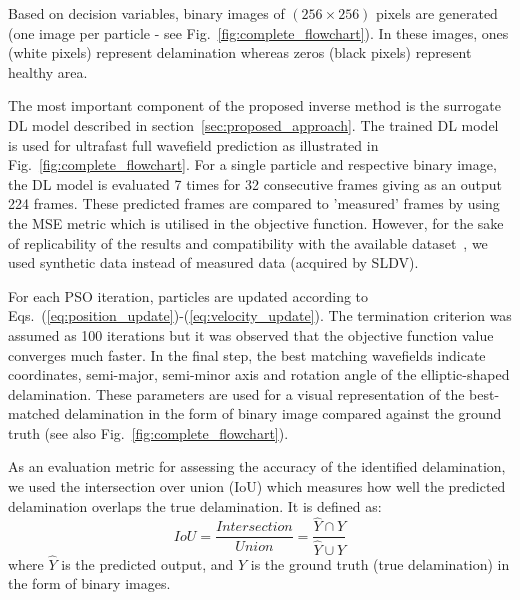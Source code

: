Based on decision variables, binary images of $(256\times256)$ pixels are generated (one image per particle - see Fig.~\ref{fig:complete_flowchart}).
In these images, ones (white pixels) represent delamination whereas zeros (black pixels) represent healthy area.

The most important component of the proposed inverse method is the surrogate DL model described in section~\ref{sec:proposed_approach}.
The trained DL model is used for ultrafast full wavefield prediction as illustrated in Fig.~\ref{fig:complete_flowchart}.
For a single particle and respective binary image, the DL model is evaluated 7 times for 32 consecutive frames giving as an output 224 frames. 
These predicted frames are compared to 'measured' frames by using the MSE metric which is utilised in the objective function.
However, for the sake of replicability of the results and compatibility with the available dataset~\cite{kudela_pawel_2021_5414555}, we used synthetic data instead of measured data (acquired by SLDV).

For each PSO iteration, particles are updated according to Eqs.~(\ref{eq:position_update})-(\ref{eq:velocity_update}).
The termination criterion was assumed as 100 iterations but it was observed that the objective function value converges much faster.
In the final step, the best matching wavefields indicate coordinates, semi-major, semi-minor axis and rotation angle of the elliptic-shaped delamination. 
These parameters are used for a visual representation of the best-matched delamination in the form of binary image compared against the ground truth (see also Fig.~\ref{fig:complete_flowchart}).

As an evaluation metric for assessing the accuracy of the identified delamination, we used the intersection over union (IoU) which measures how well the predicted delamination overlaps the true delamination. 
It is defined as:
\begin{equation}
	IoU=\frac{Intersection}{Union}=\frac{\hat{Y} \cap Y}{\hat{Y} \cup Y}
	\label{eq:iou}
\end{equation}
where \(\hat{Y}\) is the predicted output, and \(Y\) is the ground truth (true delamination) in the form of binary images.
